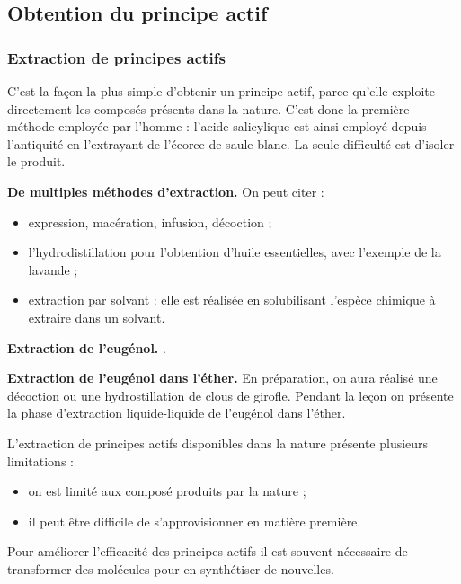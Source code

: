 \subsection{Obtention du principe actif}

\subsubsection{Extraction de principes actifs}

C'est la façon la plus simple d'obtenir un principe actif, parce qu'elle exploite directement les composés présents dans la nature.
C'est donc la première méthode employée par l'homme : l'acide salicylique est ainsi employé depuis l'antiquité en l'extrayant de l'écorce de saule blanc.
La seule difficulté est d'isoler le produit.
\begin{slide}
\textbf{De multiples méthodes d'extraction.}
On peut citer :
\begin{itemize}
\item expression, macération, infusion, décoction ;
\item l'hydrodistillation pour l'obtention d'huile essentielles, avec l'exemple de la lavande ;
\item extraction par solvant \cite{Prevost2017} : elle est réalisée en solubilisant l'espèce chimique à extraire dans un solvant. 
\end{itemize}
\end{slide}

\begin{slide}
\textbf{Extraction de l'eugénol.}
\cite{Prevost2017}.
\end{slide}

\begin{experience}
\textbf{Extraction de l'eugénol dans l'éther.}
En préparation, on aura réalisé une décoction ou une hydrostillation de clous de girofle.
Pendant la leçon on présente la phase d'extraction liquide-liquide de l'eugénol dans l'éther.
\end{experience}

\begin{transition}
L'extraction de principes actifs disponibles dans la nature présente plusieurs limitations :
\begin{itemize}
\item on est limité aux composé produits par la nature ;
\item il peut être difficile de s'approvisionner en matière première.
\end{itemize}
Pour améliorer l'efficacité des principes actifs il est souvent nécessaire de transformer des molécules pour en synthétiser de nouvelles.
\end{transition}

